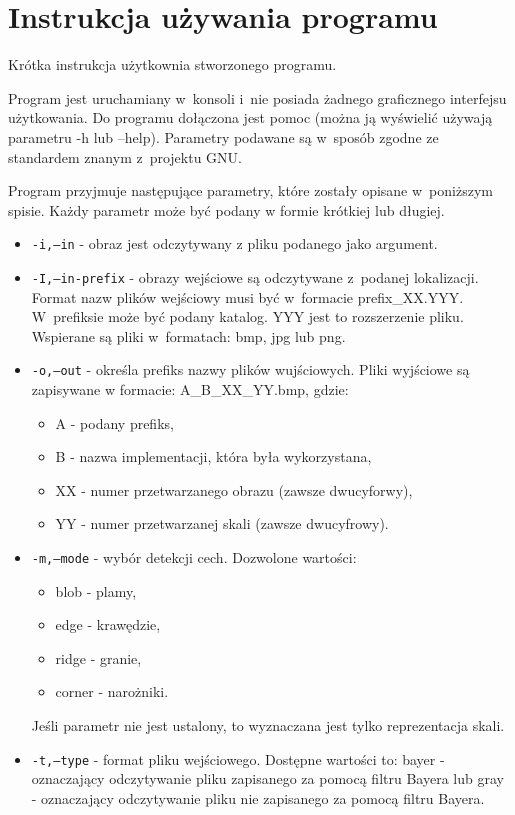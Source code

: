 \chapter{Instrukcja używania programu}
\label{cha:instrukcja}

Krótka instrukcja użytkownia stworzonego programu.

Program jest uruchamiany w~konsoli i~nie posiada żadnego graficznego interfejsu użytkowania. Do programu dołączona jest pomoc (można ją wyświelić używają parametru -h lub --help). Parametry podawane są w~sposób zgodne ze standardem znanym z~projektu GNU.

Program przyjmuje następujące parametry, które zostały opisane w~poniższym spisie. Każdy parametr może być podany w formie krótkiej lub długiej.

\begin{itemize}
\item \texttt{-i,--in} - obraz jest odczytywany z pliku podanego jako argument.
\item \texttt{-I,--in-prefix} - obrazy wejściowe są odczytywane z~podanej lokalizacji. Format nazw plików wejściowy musi być w~formacie prefix\_XX.YYY. W~prefiksie może być podany katalog. YYY jest to rozszerzenie pliku. Wspierane są pliki w~formatach: bmp, jpg lub png.
\item \texttt{-o,--out} - określa prefiks nazwy plików wujściowych. Pliki wyjściowe są zapisywane w formacie: A\_B\_XX\_YY.bmp, gdzie:
	\begin{itemize}
		\item A - podany prefiks,
		\item B - nazwa implementacji, która była wykorzystana,
		\item XX - numer przetwarzanego obrazu (zawsze dwucyforwy),
		\item YY - numer przetwarzanej skali (zawsze dwucyfrowy).
	\end{itemize}
\item \texttt{-m,--mode} - wybór detekcji cech. Dozwolone wartości:
	\begin{itemize}
		\item blob - plamy,
		\item edge - krawędzie,
		\item ridge - granie,
		\item corner - narożniki.
	\end{itemize}
	Jeśli parametr nie jest ustalony, to wyznaczana jest tylko reprezentacja skali.
\item \texttt{-t,--type} - format pliku wejściowego. Dostępne wartości to: bayer - oznaczający odczytywanie pliku zapisanego za pomocą filtru Bayera lub gray - oznaczający odczytywanie pliku nie zapisanego za pomocą filtru Bayera.

\end{itemize}
